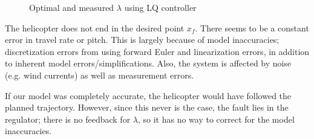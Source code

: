 \begin{figure}[H]

    \centering


    \caption{Optimal and measured $\lambda$ using LQ controller}

    \label{fig:my_label}

\end{figure}



The helicopter does not end in the desired point $x_f$. There seems to be a constant error in travel rate or pitch. This is largely  because of model inaccuracies; discretization errors from using forward Euler and linearization errors, in addition to inherent model errors/simplifications. Also, the system is affected by noise (e.g. wind currents) as well as measurement errors.



If our model was completely accurate, the helicopter would have followed the planned trajectory. However, since this never is the case, the fault lies in the regulator; there is no feedback for $\lambda$, so it has no way to correct for the model inaccuracies.







